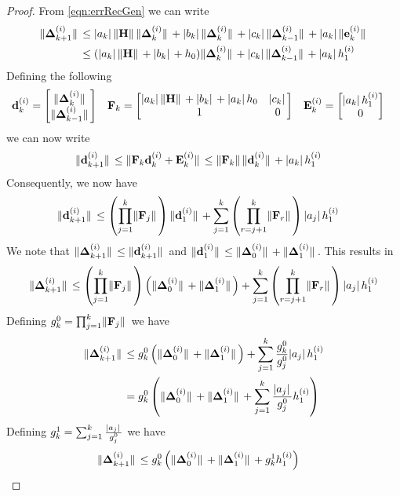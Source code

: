 \documentclass[preprint,3p,number,sort&compress]{elsarticle}
\newcommand{\bd}{\textbf{d}}
\newcommand{\be}{\textbf{e}}
\newcommand{\bE}{\textbf{E}}
\newcommand{\bF}{\textbf{F}}
\newcommand{\bH}{\textbf{H}}
\newcommand{\bDelta}{\boldsymbol{\Delta}}
\DeclarePairedDelimiter\norm{\lVert}{\rVert\,}%
\DeclarePairedDelimiter\abs{\lvert}{\rvert\,}%
\begin{document}
\begin{proof}
From \cref{eqn:errRecGen} we can write 
\begin{align*}
 \norm{\bDelta_{k+1}^{(i)}}&\leq \abs{a_k}\norm{\bH}\norm{\bDelta_{k}^{(i)}}+\abs{b_k}\norm{\bDelta_{k}^{(i)}}+\abs{c_k}\norm{\bDelta_{k-1}^{(i)}}+\abs{a_k}\norm{\be_k^{(i)}}\\
 &\leq(\abs{a_k}\norm{\bH}+\abs{b_k}+h_0)\norm{\bDelta_{k}^{(i)}}+\abs{c_k}\norm{\bDelta_{k-1}^{(i)}}+\abs{a_k}h_1^{(i)}
\end{align*}
 Defining the following 
 \begin{align*}
  \bd_k^{(i)}&=\begin{bmatrix}
   \norm{\bDelta_{k}^{(i)}}\\\norm{\bDelta_{k-1}^{(i)}}
  \end{bmatrix} & \bF_k&=\begin{bmatrix}
   \abs{a_k}\norm{\bH}+\abs{b_k}+\abs{a_k}h_0 & \abs{c_k}\\1 & 0
  \end{bmatrix} & \bE_k^{(i)}&=\begin{bmatrix}
   \abs{a_k}h_1^{(i)}\\0
  \end{bmatrix}
 \end{align*}
 we can now write
 \begin{align*}
  \norm{\bd_{k+1}^{(i)}}&\leq\norm{\bF_k\bd_{k}^{(i)}+\bE_k^{(i)}}\leq\norm{\bF_k}\norm{\bd_{k}^{(i)}}+\abs{a_k}h_1^{(i)}
 \end{align*}
 Consequently, we now have
 \begin{align*}
  \norm{\bd_{k+1}^{(i)}}&\leq\left(\prod_{j=1}^k\norm{\bF_j}\right)\norm{\bd_1^{(i)}}+\sum_{j=1}^k\left(\prod_{r=j+1}^k\norm{\bF_r}\right)\abs{a_j}h_1^{(i)}
 \end{align*}
 We note that $\norm{\bDelta_{k+1}^{(i)}}\leq\norm{\bd_{k+1}^{(i)}}$ and $\norm{\bd_1^{(i)}}\leq\norm{\bDelta_0^{(i)}}+\norm{\bDelta_1^{(i)}}$. This results in
 \begin{align*}
  \norm{\bDelta_{k+1}^{(i)}}\leq\left(\prod_{j=1}^k\norm{\bF_j}\right)\left(\norm{\bDelta_0^{(i)}}+\norm{\bDelta_1^{(i)}}\right)+\sum_{j=1}^k\left(\prod_{r=j+1}^k\norm{\bF_r}\right)\abs{a_j}h_1^{(i)}
 \end{align*}
 Defining $g_k^0=\prod_{j=1}^k\norm{\bF_j}$ we have
  \begin{align*}
  \norm{\bDelta_{k+1}^{(i)}}&\leq g_k^0\left(\norm{\bDelta_0^{(i)}}+\norm{\bDelta_1^{(i)}}\right)+\sum_{j=1}^k\frac{g_k^0}{g_j^0}\abs{a_j}h_1^{(i)}\\
  &=g_k^0\left(\norm{\bDelta_0^{(i)}}+\norm{\bDelta_1^{(i)}}+\sum_{j=1}^k\frac{\abs{a_j}}{g_j^0}h_1^{(i)}\right)
 \end{align*}
 Defining $g_k^1=\sum_{j=1}^k\frac{\abs{a_j}}{g_j^0}$ we have
  \begin{align*}
  \norm{\bDelta_{k+1}^{(i)}}&\leq g_k^0\left(\norm{\bDelta_0^{(i)}}+\norm{\bDelta_1^{(i)}}+g_k^1h_1^{(i)}\right)
 \end{align*}
\end{proof}
\end{document}

